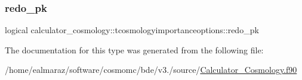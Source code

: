 \subsubsection{\texorpdfstring{redo\+\_\+pk}{redo\_pk}}
{\footnotesize\ttfamily logical calculator\+\_\+cosmology\+::tcosmologyimportanceoptions\+::redo\+\_\+pk\hspace{0.3cm}{\ttfamily [private]}}



The documentation for this type was generated from the following file\+:\begin{DoxyCompactItemize}
\item 
/home/ealmaraz/software/cosmomc/bde/v3./source/\mbox{\hyperlink{Calculator__Cosmology_8f90}{Calculator\+\_\+\+Cosmology.\+f90}}\end{DoxyCompactItemize}
